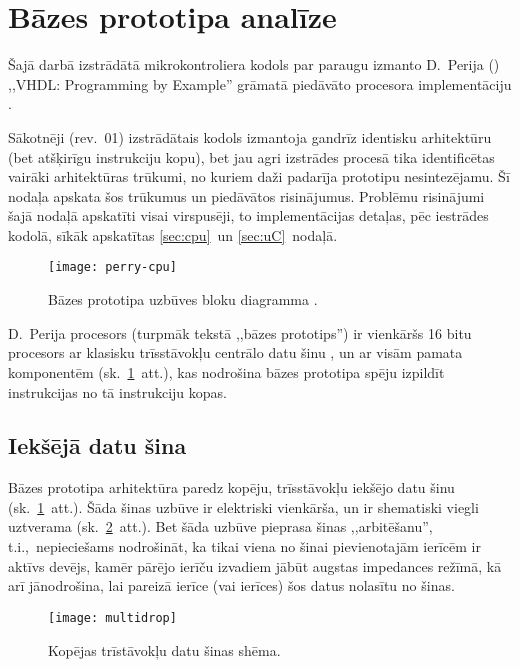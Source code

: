 \section{Bāzes prototipa analīze}
Šajā darbā izstrādātā mikrokontroliera kodols par paraugu izmanto
D.~Perija () ,,VHDL: Programming by Example'' grāmatā
piedāvāto procesora imple\-men\-tā\-ciju \cite{Perry-VHDL}.

Sākotnēji (rev.~01) izstrādātais kodols izmantoja gandrīz identisku
arhitektūru (bet atšķirīgu instrukciju kopu), bet
jau agri izstrādes procesā tika identificētas vairāki arhitektūras trūkumi,
no kuriem daži padarīja prototipu nesintezējamu.
Šī nodaļa apskata šos trūkumus un piedāvātos risinājumus.
Problēmu risinājumi šajā nodaļā apskatīti visai virspusēji,
to implementācijas detaļas, pēc iestrādes kodolā,
sīkāk apskatītas \ref{sec:cpu}~un \ref{sec:uC}~nodaļā.

\begin{figure}[thb]
	\centering
	\texttt{[image: perry-cpu]}
	\caption[Bāzes prototipa uzbūves bloku diagramma.]
	        {Bāzes prototipa uzbūves bloku diagramma \cite[290.~lpp.]{Perry-VHDL}.}
	\label{fig:perry-cpu}
\end{figure}

D.~Perija procesors (turpmāk tekstā ,,bāzes prototips'')
ir vienkāršs 16 bitu procesors ar klasisku trīsstāvokļu 
centrālo datu šinu \cite{Flynn-arch}\cite{Heath}, un ar visām pamata
komponentēm (sk.~\ref{fig:perry-cpu}~att.), kas nodrošina bāzes prototipa
spēju izpildīt instrukcijas no tā instrukciju kopas.

\subsection{Iekšējā datu šina} \label{sec:perry-bus}
	Bāzes prototipa arhitektūra paredz kopēju, trīsstāvokļu iekšējo datu šinu
	(sk.~\ref{fig:perry-cpu}~att.).
	Šāda šinas uzbūve ir elektriski vienkārša, un ir shematiski viegli uztverama
	(sk.~\ref{fig:multidrop}~att.). Bet šāda uzbūve pieprasa šinas 
	,,arbitēšanu'', t.i.,~nepieciešams
	nodrošināt, ka tikai viena no šinai pievienotajām ierīcēm ir aktīvs devējs,
	kamēr pārējo ierīču izvadiem jābūt augstas impedances režīmā, kā arī
	jānodrošina, lai pareizā ierīce (vai ierīces) šos datus nolasītu no šinas.

	\begin{figure}[thb]
		\centering
		\texttt{[image: multidrop]}
		\caption{Kopējas trīstāvokļu datu šinas shēma.}
		\label{fig:multidrop}
	\end{figure}

